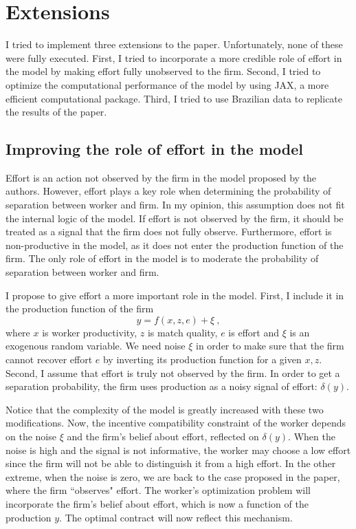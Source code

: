 \documentclass{article}
\begin{document}
\section{Extensions}

I tried to implement three extensions to the paper. Unfortunately, none of these were fully executed. First, I tried to incorporate a more credible role of effort in the model by making effort fully unobserved to the firm. Second, I tried to optimize the computational performance of the model by using JAX, a more efficient computational package. Third, I tried to use Brazilian data to replicate the results of the paper.  

\subsection{Improving the role of effort in the model}

Effort is an action not observed by the firm in the model proposed by the authors. However, effort plays a key role when determining the probability of separation between worker and firm. In my opinion, this assumption does not fit the internal logic of the model. If effort is not observed by the firm, it should be treated as a signal that the firm does not fully observe. Furthermore, effort is non-productive in the model, as it does not enter the production function of the firm. The only role of effort in the model is to moderate the probability of separation between worker and firm.

I propose to give effort a more important role in the model. First, I include it in the production function of the firm $$ y = f(x,z,e) + \xi \ , $$ where $x$ is worker productivity, $z$ is match quality, $e$ is effort and $\xi$ is an exogenous random variable. We need noise $\xi$ in order to make sure that the firm cannot recover effort $e$ by inverting its production function for a given $x,z$. Second, I assume that effort is truly not observed by the firm. In order to get a separation probability, the firm uses production as a noisy signal of effort: $\delta(y)$.

Notice that the complexity of the model is greatly increased with these two modifications. Now, the incentive compatibility constraint of the worker depends on the noise $\xi$ and the firm's belief about effort, reflected on $\delta(y)$. When the noise is high and the signal is not informative, the worker may choose a low effort since the firm will not be able to distinguish it from a high effort. In the other extreme, when the noise is zero, we are back to the case proposed in the paper, where the firm ``observes" effort. The worker's optimization problem will incorporate the firm's belief about effort, which is now a function of the production $y$. The optimal contract will now reflect this mechanism.
\end{document}
